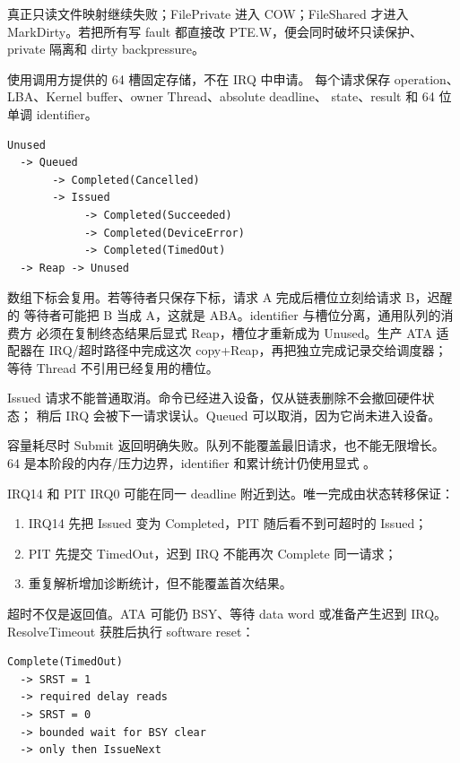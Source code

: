 真正只读文件映射继续失败；FilePrivate 进入 COW；FileShared 才进入
MarkDirty。若把所有写 fault 都直接改 PTE.W，便会同时破坏只读保护、private
隔离和 dirty backpressure。

 使用调用方提供的 64 槽固定存储，不在 IRQ 中申请。
每个请求保存 operation、LBA、Kernel buffer、owner Thread、absolute deadline、
state、result 和 64 位单调 identifier。

\begin{lstlisting}
Unused
  -> Queued
       -> Completed(Cancelled)
       -> Issued
            -> Completed(Succeeded)
            -> Completed(DeviceError)
            -> Completed(TimedOut)
  -> Reap -> Unused
\end{lstlisting}

数组下标会复用。若等待者只保存下标，请求 A 完成后槽位立刻给请求 B，迟醒的
等待者可能把 B 当成 A，这就是 ABA。identifier 与槽位分离，通用队列的消费方
必须在复制终态结果后显式 Reap，槽位才重新成为 Unused。生产 ATA 适配器在
IRQ/超时路径中完成这次 copy+Reap，再把独立完成记录交给调度器；等待 Thread
不引用已经复用的槽位。

Issued 请求不能普通取消。命令已经进入设备，仅从链表删除不会撤回硬件状态；
稍后 IRQ 会被下一请求误认。Queued 可以取消，因为它尚未进入设备。

容量耗尽时 Submit 返回明确失败。队列不能覆盖最旧请求，也不能无限增长。
64 是本阶段的内存/压力边界，identifier 和累计统计仍使用显式 。

IRQ14 和 PIT IRQ0 可能在同一 deadline 附近到达。唯一完成由状态转移保证：

\begin{enumerate}
  \item IRQ14 先把 Issued 变为 Completed，PIT 随后看不到可超时的 Issued；
  \item PIT 先提交 TimedOut，迟到 IRQ 不能再次 Complete 同一请求；
  \item 重复解析增加诊断统计，但不能覆盖首次结果。
\end{enumerate}

超时不仅是返回值。ATA 可能仍 BSY、等待 data word 或准备产生迟到 IRQ。
ResolveTimeout 获胜后执行 software reset：

\begin{lstlisting}
Complete(TimedOut)
  -> SRST = 1
  -> required delay reads
  -> SRST = 0
  -> bounded wait for BSY clear
  -> only then IssueNext
\end{lstlisting}

